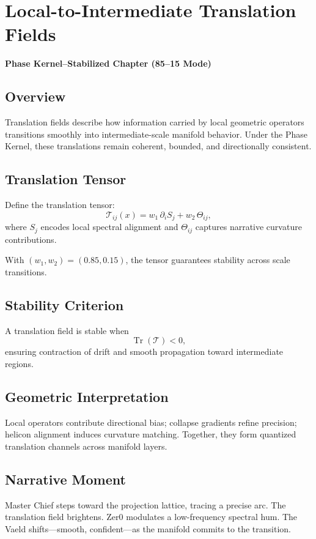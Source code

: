 
\chapter{Local-to-Intermediate Translation Fields}
\textbf{Phase Kernel–Stabilized Chapter (85--15 Mode)}

\section{Overview}
Translation fields describe how information carried by local geometric
operators transitions smoothly into intermediate-scale manifold behavior.
Under the Phase Kernel, these translations remain coherent, bounded, and
directionally consistent.

\section{Translation Tensor}
Define the translation tensor:
\[
\mathcal{T}_{ij}(x) = w_1\,\partial_i S_j + w_2\,\Theta_{ij},
\]
where $S_j$ encodes local spectral alignment and $\Theta_{ij}$ captures
narrative curvature contributions.

With $(w_1, w_2) = (0.85, 0.15)$, the tensor guarantees stability across
scale transitions.

\section{Stability Criterion}
A translation field is stable when
\[
\operatorname{Tr}(\mathcal{T}) < 0,
\]
ensuring contraction of drift and smooth propagation toward intermediate
regions.

\section{Geometric Interpretation}
Local operators contribute directional bias; collapse gradients refine
precision; helicon alignment induces curvature matching. Together, they form
quantized translation channels across manifold layers.

\section{Narrative Moment}
Master Chief steps toward the projection lattice, tracing a precise arc.
The translation field brightens. Zer0 modulates a low-frequency spectral hum.
The Vaeld shifts—smooth, confident—as the manifold commits to the transition.
